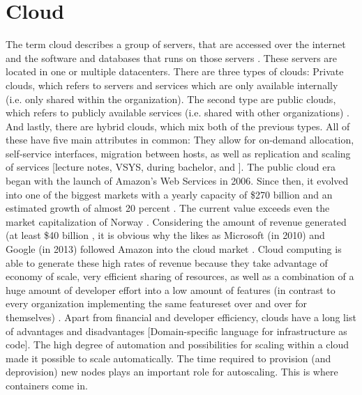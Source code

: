 \section{Cloud}
The term cloud describes a group of servers, that are accessed over the internet and the software and databases that runs on those servers \cite{cloudflare_what_is_cloud}. These servers are located in one or multiple datacenters. There are three types of clouds: Private clouds, which refers to servers and services which are only available internally (i.e. only shared within the organization). The second type are public clouds, which refers to publicly available services (i.e. shared with other organizations) \cite{cloudflare_what_is_private_cloud}. And lastly, there are hybrid clouds, which mix both of the previous types. All of these have five main attributes in common: They allow for on-demand allocation, self-service interfaces, migration between hosts, as well as replication and scaling of services [lecture notes, VSYS, during bachelor, and \cite{microsoft_what_is_private_cloud}].
\newline
The public cloud era began with the launch of Amazon's Web Services in 2006. Since then, it evolved into one of the biggest markets with a yearly capacity of \$270 billion and an estimated growth of almost 20 percent \cite{gartner_forecast_cloud_spending}. The current value exceeds even the market capitalization of Norway \cite{indexmundi_ranking}. Considering the amount of revenue generated (at least \$40 billion \cite{indexmundi_ranking}, it is obvious why the likes as Microsoft (in 2010) and Google (in 2013) followed Amazon into the cloud market \cite{cbinsights_multi_cloud_strategies}.
\newline
Cloud computing is able to generate these high rates of revenue because they take advantage of economy of scale, very efficient sharing of resources, as well as a combination of a huge amount of developer effort into a low amount of features (in contrast to every organization implementing the same featureset over and over for themselves) \cite{forbes_cloud_economy_scale}.
\newline
Apart from financial and developer efficiency, clouds have a long list of advantages and disadvantages [Domain-specific language for infrastructure as code]. %
\newline
The high degree of automation and possibilities for scaling within a cloud made it possible to scale automatically. The time required to provision (and deprovision) new nodes plays an important role for autoscaling. This is where containers come in.

